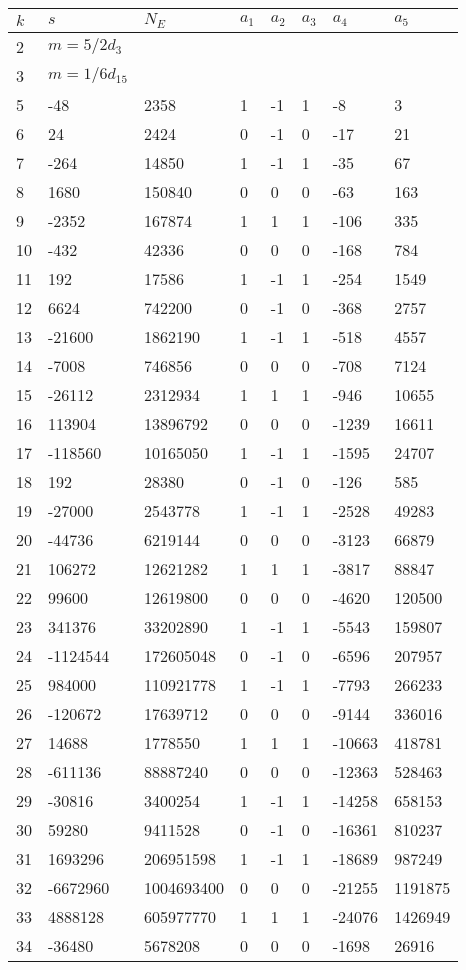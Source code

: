 \documentclass{amsart}
\begin{document}
\begin{longtable}{|l|l|l|lllll|}
\hline
$k$ & $s$ & $N_E$ & $a_1$ & $a_2$ & $a_3$ & $a_4$ & $a_5$\\
\hline
2&$m=5/2d_{3}$&&\multicolumn{5}{c|}{}\\
3&$m=1/6d_{15}$&&\multicolumn{5}{c|}{}\\
5&-48&2358&1&-1&1&-8&3\\
6&24&2424&0&-1&0&-17&21\\
7&-264&14850&1&-1&1&-35&67\\
8&1680&150840&0&0&0&-63&163\\
9&-2352&167874&1&1&1&-106&335\\
10&-432&42336&0&0&0&-168&784\\
11&192&17586&1&-1&1&-254&1549\\
12&6624&742200&0&-1&0&-368&2757\\
13&-21600&1862190&1&-1&1&-518&4557\\
14&-7008&746856&0&0&0&-708&7124\\
15&-26112&2312934&1&1&1&-946&10655\\
16&113904&13896792&0&0&0&-1239&16611\\
17&-118560&10165050&1&-1&1&-1595&24707\\
18&192&28380&0&-1&0&-126&585\\
19&-27000&2543778&1&-1&1&-2528&49283\\
20&-44736&6219144&0&0&0&-3123&66879\\
21&106272&12621282&1&1&1&-3817&88847\\
22&99600&12619800&0&0&0&-4620&120500\\
23&341376&33202890&1&-1&1&-5543&159807\\
24&-1124544&172605048&0&-1&0&-6596&207957\\
25&984000&110921778&1&-1&1&-7793&266233\\
26&-120672&17639712&0&0&0&-9144&336016\\
27&14688&1778550&1&1&1&-10663&418781\\
28&-611136&88887240&0&0&0&-12363&528463\\
29&-30816&3400254&1&-1&1&-14258&658153\\
30&59280&9411528&0&-1&0&-16361&810237\\
31&1693296&206951598&1&-1&1&-18689&987249\\
32&-6672960&1004693400&0&0&0&-21255&1191875\\
33&4888128&605977770&1&1&1&-24076&1426949\\
34&-36480&5678208&0&0&0&-1698&26916\\

\end{longtable}
\end{document}
